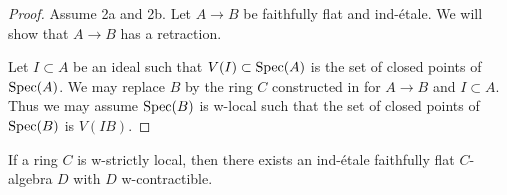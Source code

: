 \begin{proof}

  Assume 2a and 2b. Let $A \to B$ be faithfully flat and ind-\'etale. 
  We will show that $A \to B$ has a retraction.

  Let $I \subset A$ be an ideal such that $V(I) \subset \operatorname{Spec} (A)$ is the set of closed points of $\operatorname{Spec} (A)$. We may replace $B$ by the ring $C$ constructed in  for $A \to B$ and $I \subset A$. Thus we may assume $\operatorname{Spec} (B)$ is w-local such that the set of closed points of $\operatorname{Spec} (B)$ is $V(IB)$. 

\end{proof}
  

\begin{lemma}
  If a ring \(C\) is w-strictly local, then there exists an ind-étale faithfully flat \(C\)-algebra \(D\) with \(D\) w-contractible.
  \label{thm:ind-etale-w-contractible-cover-of-w-strictly-local}
\end{lemma}

